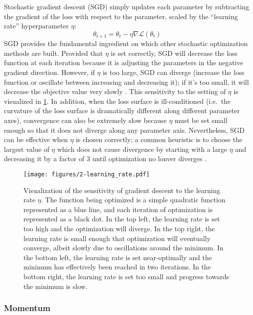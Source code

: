 Stochastic gradient descent (SGD) simply updates each parameter by subtracting the gradient of the loss with respect to the parameter, scaled by the ``learning rate'' hyperparameter $\eta$:
\begin{equation}
\theta_{t + 1} = \theta_t - \eta \nabla \mathcal{L}(\theta_t)
\end{equation}
SGD provides the fundamental ingredient on which other stochastic optimization methods are built.
Provided that $\eta$ is set correctly, SGD will decrease the loss function at each iteration because it is adjusting the parameters in the negative gradient direction.
However, if $\eta$ is too large, SGD can diverge (increase the loss function or oscillate between increasing and decreasing it); if it's too small, it will decrease the objective value very slowly \cite{}.
This sensitivity to the setting of $\eta$ is visualized in \cref{fig:learning_rate}.
In addition, when the loss surface is ill-conditioned (i.e.\ the curvature of the loss surface is dramatically different along different parameter axes), convergence can also be extremely slow because $\eta$ must be set small enough so that it does not diverge along any parameter axis.
Nevertheless, SGD can be effective when $\eta$ is chosen correctly; a common heuristic is to choose the largest value of $\eta$ which does not cause divergence by starting with a large $\eta$ and decreasing it by a factor of $3$ until optimization no lonver diverges \cite{}.

\begin{figure}
  \centering
  \texttt{[image: figures/2-learning\_rate.pdf]}
  \caption[Sensitivity of gradient descent to the learning rate]{Visualization of the sensitivity of gradient descent to the learning rate $\eta$.
  The function being optimized is a simple quadratic function represented as a blue line, and each iteration of optimization is represented as a black dot.
  In the top left, the learning rate is set too high and the optimization will diverge.
  In the top right, the learning rate is small enough that optimization will eventually converge, albeit slowly due to oscillations around the minimum.
  In the bottom left, the learning rate is set near-optimally and the minimum has effectively been reached in two iterations.
  In the bottom right, the learning rate is set too small and progress towards the minimum is slow.}
  \label{fig:learning_rate}
\end{figure}

\subsubsection{Momentum}

